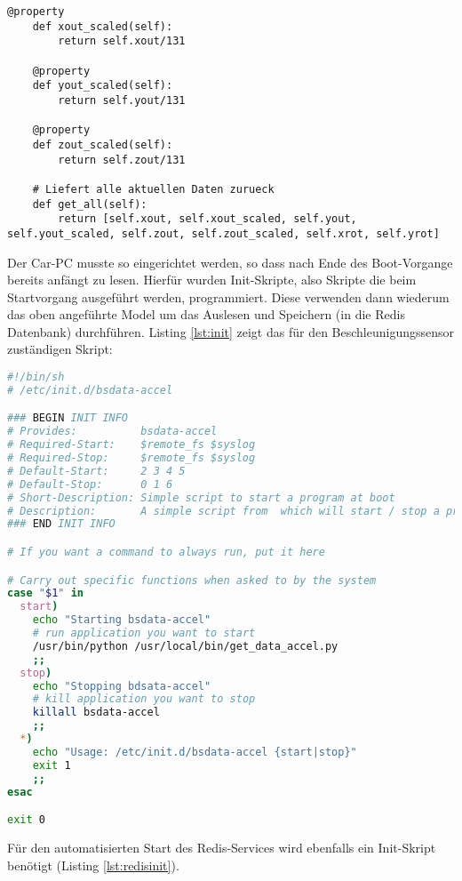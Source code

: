 \begin{lstlisting}[style=pythonstyle, caption=Sensorenmodell, label={lst:sensorsammlung}]
    @property
    def xout_scaled(self):
        return self.xout/131

    @property
    def yout_scaled(self):
        return self.yout/131

    @property
    def zout_scaled(self):
        return self.zout/131

    # Liefert alle aktuellen Daten zurueck
    def get_all(self):
        return [self.xout, self.xout_scaled, self.yout, self.yout_scaled, self.zout, self.zout_scaled, self.xrot, self.yrot]
\end{lstlisting}

Der Car-PC musste so eingerichtet werden, so dass nach Ende des Boot-Vorgange bereits anfängt zu lesen. Hierfür wurden Init-Skripte, also Skripte die beim Startvorgang ausgeführt werden, programmiert. Diese verwenden dann wiederum das oben angeführte Model um das Auslesen und Speichern (in die Redis Datenbank) durchführen. Listing \ref{lst:init} zeigt das für den Beschleunigungssensor zuständigen Skript:

\begin{lstlisting}[language=Bash, caption=Beschleunigungssensor Service, label={lst:init}]
#!/bin/sh
# /etc/init.d/bsdata-accel

### BEGIN INIT INFO
# Provides:          bsdata-accel
# Required-Start:    $remote_fs $syslog
# Required-Stop:     $remote_fs $syslog
# Default-Start:     2 3 4 5
# Default-Stop:      0 1 6
# Short-Description: Simple script to start a program at boot
# Description:       A simple script from  which will start / stop a program a boot / shutdown.
### END INIT INFO

# If you want a command to always run, put it here

# Carry out specific functions when asked to by the system
case "$1" in
  start)
    echo "Starting bsdata-accel"
    # run application you want to start
    /usr/bin/python /usr/local/bin/get_data_accel.py
    ;;
  stop)
    echo "Stopping bdsata-accel"
    # kill application you want to stop
    killall bsdata-accel
    ;;
  *)
    echo "Usage: /etc/init.d/bsdata-accel {start|stop}"
    exit 1
    ;;
esac

exit 0
\end{lstlisting}

Für den automatisierten Start des Redis-Services wird ebenfalls ein Init-Skript benötigt (Listing \ref{lst:redisinit}).

